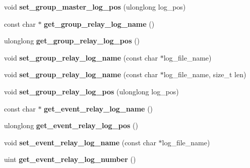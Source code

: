 \begin{DoxyCompactItemize}
void {\bfseries set\+\_\+group\+\_\+master\+\_\+log\+\_\+pos} (ulonglong log\+\_\+pos)
\item 
\mbox{\label{classRelay__log__info_a558b6c2e5188bb6c8193ae58cf16b37b}} 
const char $\ast$ {\bfseries get\+\_\+group\+\_\+relay\+\_\+log\+\_\+name} ()
\item 
\mbox{\label{classRelay__log__info_aa37efaa27105175aa1a8150ac99516ba}} 
ulonglong {\bfseries get\+\_\+group\+\_\+relay\+\_\+log\+\_\+pos} ()
\item 
\mbox{\label{classRelay__log__info_ad39832d845e98bda4155f53e46be43ce}} 
void {\bfseries set\+\_\+group\+\_\+relay\+\_\+log\+\_\+name} (const char $\ast$log\+\_\+file\+\_\+name)
\item 
\mbox{\label{classRelay__log__info_aa3cd0b41f9d6ebe001f1263e8a380256}} 
void {\bfseries set\+\_\+group\+\_\+relay\+\_\+log\+\_\+name} (const char $\ast$log\+\_\+file\+\_\+name, size\+\_\+t len)
\item 
\mbox{\label{classRelay__log__info_ab30d735a6743ed558d05951c652e3712}} 
void {\bfseries set\+\_\+group\+\_\+relay\+\_\+log\+\_\+pos} (ulonglong log\+\_\+pos)
\item 
\mbox{\label{classRelay__log__info_af5c25a0d3d0e626411044867a4e66634}} 
const char $\ast$ {\bfseries get\+\_\+event\+\_\+relay\+\_\+log\+\_\+name} ()
\item 
\mbox{\label{classRelay__log__info_ad013b8da0a5155399d46c0782a09bd2b}} 
ulonglong {\bfseries get\+\_\+event\+\_\+relay\+\_\+log\+\_\+pos} ()
\item 
\mbox{\label{classRelay__log__info_af064a83db2cde40d72badef1bf24ac57}} 
void {\bfseries set\+\_\+event\+\_\+relay\+\_\+log\+\_\+name} (const char $\ast$log\+\_\+file\+\_\+name)
\item 
\mbox{\label{classRelay__log__info_a9d92d490a28f3eea58110f2bb29240b4}} 
uint {\bfseries get\+\_\+event\+\_\+relay\+\_\+log\+\_\+number} ()
\item 

\end{DoxyCompactItemize}
